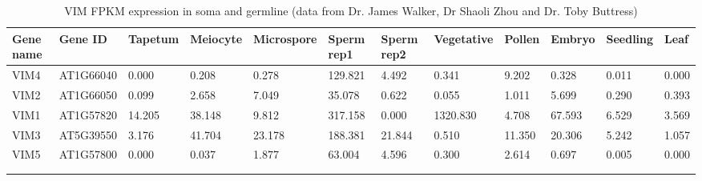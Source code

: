 \begin{landscape}
\begin{longtable}{ll|llllllll|ll}
Gene name & Gene ID & Tapetum & Meiocyte & Microspore & Sperm rep1 & Sperm rep2 & Vegetative & Pollen & Embryo & Seedling & Leaf \\ \hline
\endfirsthead
%
\endhead
%
VIM4 & AT1G66040 & 0.000  & 0.208  & 0.278  & 129.821 & 4.492  & 0.341    & 9.202  & 0.328  & 0.011 & 0.000 \\
VIM2 & AT1G66050 & 0.099  & 2.658  & 7.049  & 35.078  & 0.622  & 0.055    & 1.011  & 5.699  & 0.290 & 0.393 \\
VIM1 & AT1G57820 & 14.205 & 38.148 & 9.812  & 317.158 & 0.000  & 1320.830 & 4.708  & 67.593 & 6.529 & 3.569 \\
VIM3 & AT5G39550 & 3.176  & 41.704 & 23.178 & 188.381 & 21.844 & 0.510    & 11.350 & 20.306 & 5.242 & 1.057 \\
VIM5 & AT1G57800 & 0.000  & 0.037  & 1.877  & 63.004  & 4.596  & 0.300    & 2.614  & 0.697  & 0.005 & 0.000 \\
\caption{VIM FPKM expression in soma and germline (data from Dr. James Walker, Dr Shaoli Zhou and Dr. Toby Buttress)} \\
\label{tab:VIM_expression}\\
\end{longtable}
\end{landscape}